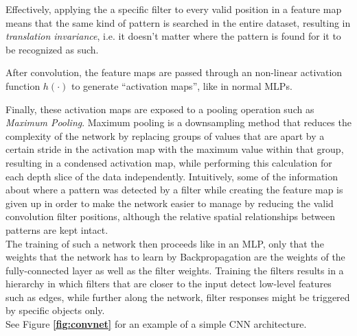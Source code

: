Effectively, applying the a specific filter to every valid position in a feature map means that the same kind of pattern is searched in the entire dataset, resulting in \textit{translation invariance}, i.e. it doesn't matter where the pattern is found for it to be recognized as such.

After convolution, the feature maps are passed through an non-linear activation function $h(\cdot)$ to generate ``activation maps'', like in normal MLPs.

\noindent Finally, these activation maps are exposed to a pooling operation such as \textit{Maximum Pooling}. Maximum pooling is a downsampling method that reduces the complexity of the network by replacing groups of values that are apart by a certain stride in the activation map with the maximum value within that group, resulting in a condensed activation map, while performing this calculation for each depth slice of the data independently. Intuitively, some of the information about where a pattern was detected by a filter while creating the feature map is given up in order to make the network easier to manage by reducing the valid convolution filter positions, although the relative spatial relationships between patterns are kept intact. \cite[pp. 330-345]{deeplearning_book}\\

\noindent The training of such a network then proceeds like in an MLP, only that the weights that the network has to learn by Backpropagation are the weights of the fully-connected layer as well as the filter weights. Training the filters results in a hierarchy in which filters that are closer to the input detect low-level features such as edges, while further along the network, filter responses might be triggered by specific objects only.\\

\noindent See Figure \textbf{\ref{fig:convnet}} for an example of a simple CNN architecture.

